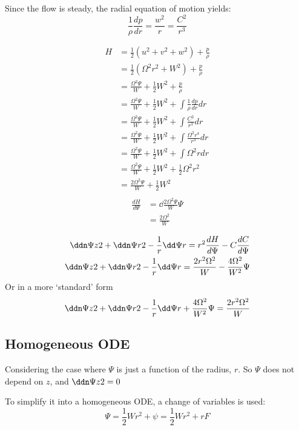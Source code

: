 \documentclass{X:/Documents/Coding/Latex/myreport}
\begin{document}
Since the flow is steady, the radial equation of motion yields:
\[\frac1\rho \frac{dp}{dr} = \frac{w^2}{r} = \frac{C^2}{r^3}\]

\begin{align*}
H &= \frac12 (u^2 + v^2 + w^2) + \frac p\rho\\
&=\frac12 (\Omega^2r^2 + W^2) + \frac p\rho   \\
&=\frac{\Omega^2 \Psi}{W} + \frac12 W^2 + \frac p\rho\\
&=\frac{\Omega^2 \Psi}{W} + \frac12 W^2 +  \int \frac1\rho\frac{dp}{dr} dr\\
&=\frac{\Omega^2 \Psi}{W} + \frac12 W^2 +  \int \frac{C^2}{r^3} dr\\
&=\frac{\Omega^2 \Psi}{W} + \frac12 W^2 +  \int \frac{\Omega^2 r^4}{r^3} dr\\
&=\frac{\Omega^2 \Psi}{W} + \frac12 W^2 +  \int \Omega^2 r dr\\
&=\frac{\Omega^2 \Psi}{W} + \frac12 W^2 +  \frac12 \Omega^2 r^2 \\
&=\frac{2\Omega^2 \Psi}{W} + \frac12 W^2 \\
\end{align*}
\begin{align*}
\frac{dH}{d\Psi} &=\dd{\frac{2\Omega^2 \Psi}{W}}{\Psi}\\
&=  \frac{2\Omega^2}{W}    
\end{align*}


\begin{align*}
    \ddn \Psi z 2 + \ddn \Psi r2 - \frac1r \dd\Psi r= r^2 \frac{dH}{d\Psi} - C\frac{dC}{d\Psi}\\
    \ddn \Psi z 2 + \ddn \Psi r2 - \frac1r \dd\Psi r= \frac{2 r^2 \Omega^2}{W} - \frac{4\Omega^2}{W^2}\Psi\\
\end{align*}
Or in a more `standard' form
\[\ddn \Psi z 2 + \ddn \Psi r2 - \frac1r \dd\Psi r + \frac{4\Omega^2}{W^2}\Psi= \frac{2 r^2 \Omega^2}{W} \]



\clearpage
\subsection{Homogeneous ODE}
Considering the case where $\Psi$ is just a function of the radius, $r$. So $\Psi$ does not depend on $z$, and $\ddn\Psi z2 = 0$ 

To simplify it into a homogeneous ODE, a change of variables is used:
 \[\Psi = \frac12 W r^2 + \psi = \frac12 W r^2 + rF\]
\end{document}
